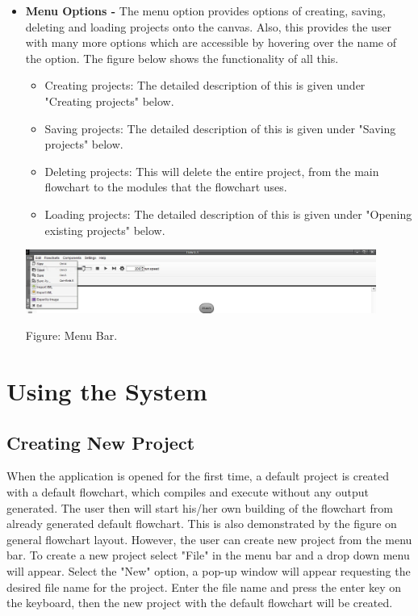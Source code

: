 \documentclass[11pt,a4paper,titlepage]{article}
\begin{document}
\begin{itemize}
						
			\item \textbf{Menu Options -} The menu option provides options of creating, saving, deleting and loading projects onto the canvas. Also, this provides the user with many more options which are accessible by hovering over the name of the option. The figure below shows the functionality of all this.\newline 
		
		\begin{itemize}
		\item Creating projects: The detailed description of this is given under "Creating projects"  below.
		\item Saving projects:  The detailed description of this is given under "Saving projects" below.
		\item Deleting projects: This will delete the entire project, from the main flowchart to the modules that the flowchart uses.
		\item Loading projects: The detailed description of this is given under "Opening existing projects" below.
\end{itemize}				
			
			
			\includegraphics[width=11.5cm]{Menu.jpg}
			\begin{center}
		Figure: Menu Bar.
		\end{center}
			
			
		\end{itemize}

	\newpage
	
	
	
	
	
	
\section{Using the System}
	\subsection{Creating New Project}
	
	When the application is opened for the first time, a default project is created with a default flowchart, which compiles and execute without any output generated. The user then will start his/her own building of the flowchart from already generated default flowchart. This is also demonstrated by the figure on general flowchart layout. \newline\newline
However, the user can create new project from the menu bar. To create a new project select "File" in the menu bar and a drop down menu will appear. Select the "New" option, a pop-up window will appear requesting the desired file name for the project. Enter the file name and press the enter key on the keyboard, then the new project with the default flowchart will be created. \newline
		
\end{document}
